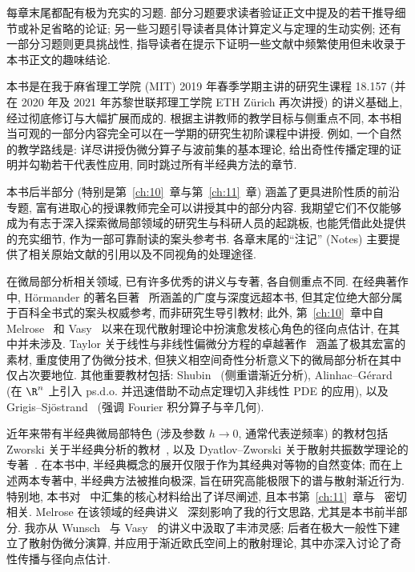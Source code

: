 每章末尾都配有极为充实的习题. 部分习题要求读者验证正文中提及的若干推导细节或补足省略的论证; 另一些习题引导读者具体计算定义与定理的生动实例; 还有一部分习题则更具挑战性, 指导读者在提示下证明一些文献中频繁使用但未收录于本书正文的趣味结论.

本书是在我于麻省理工学院 (MIT) 2019 年春季学期主讲的研究生课程 18.157 (并在 2020 年及 2021 年苏黎世联邦理工学院 ETH Zürich 再次讲授) 的讲义基础上, 经过彻底修订与大幅扩展而成的. 根据主讲教师的教学目标与侧重点不同, 本书相当可观的一部分内容完全可以在一学期的研究生初阶课程中讲授. 例如, 一个自然的教学路线是: 详尽讲授伪微分算子与波前集的基本理论, 给出奇性传播定理的证明并勾勒若干代表性应用, 同时跳过所有半经典方法的章节.

本书后半部分 (特别是第~\ref{ch:10}~章与第~\ref{ch:11}~章) 涵盖了更具进阶性质的前沿专题, 富有进取心的授课教师完全可以讲授其中的部分内容. 我期望它们不仅能够成为有志于深入探索微局部领域的研究生与科研人员的起跳板, 也能凭借此处提供的充实细节, 作为一部可靠耐读的案头参考书. 各章末尾的``注记'' (Notes) 主要提供了相关原始文献的引用以及不同视角的处理途径.

在微局部分析相关领域, 已有许多优秀的讲义与专著, 各自侧重点不同. 在经典著作中, Hörmander 的著名巨著~\cite{Hor03,Hor05,Hor07,Hor09} 所涵盖的广度与深度远超本书, 但其定位绝大部分属于百科全书式的案头权威参考, 而非研究生导引教材; 此外, 第~\ref{ch:10}~章中自 Melrose~\cite{Mel94} 和 Vasy~\cite{Vas13} 以来在现代散射理论中扮演愈发核心角色的径向点估计, 在其中并未涉及. Taylor 关于线性与非线性偏微分方程的卓越著作~\cite{Tay81,Tay11a,Tay11b,Tay11c} 涵盖了极其宏富的素材, 重度使用了伪微分技术, 但狭义相空间奇性分析意义下的微局部分析在其中仅占次要地位. 其他重要教材包括: Shubin~\cite{Shu87} (侧重谱渐近分析), Alinhac--Gérard~\cite{AG07} (在 $\R^n$ 上引入 ps.d.o. 并迅速借助不动点定理切入非线性 PDE 的应用), 以及 Grigis--Sjöstrand~\cite{GS94} (强调 Fourier 积分算子与辛几何).

近年来带有半经典微局部特色 (涉及参数 $h \to 0$, 通常代表逆频率) 的教材包括 Zworski 关于半经典分析的教材~\cite{Zwo12}, 以及 Dyatlov--Zworski 关于散射共振数学理论的专著~\cite{DZ19}. 在本书中, 半经典概念的展开仅限于作为其经典对等物的自然变体; 而在上述两本专著中, 半经典方法被推向极深, 旨在研究高能极限下的谱与散射渐近行为. 特别地, 本书对~\cite[附录 E]{DZ19} 中汇集的核心材料给出了详尽阐述, 且本书第~\ref{ch:11}~章与~\cite[\S 5.7]{DZ19} 密切相关. Melrose 在该领域的经典讲义~\cite{Mel07} 深刻影响了我的行文思路, 尤其是本书前半部分. 我亦从 Wunsch~\cite{Wun13} 与 Vasy~\cite{Vas18} 的讲义中汲取了丰沛灵感; 后者在极大一般性下建立了散射伪微分演算, 并应用于渐近欧氏空间上的散射理论, 其中亦深入讨论了奇性传播与径向点估计.

